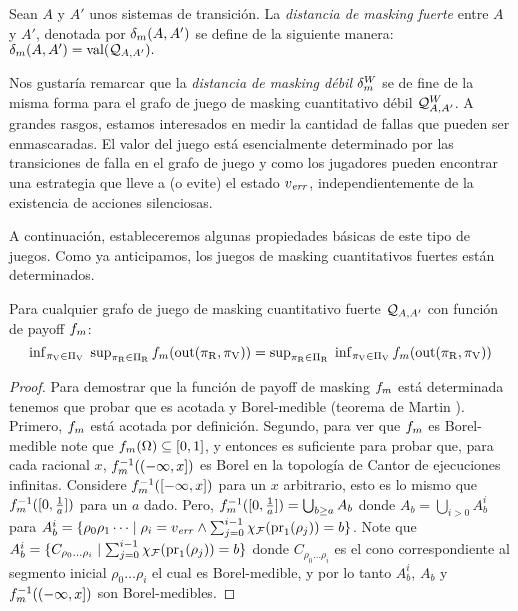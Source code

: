 \begin{defi} \label{def:mask_dist}
 Sean $A$ y $A'$ unos sistemas de transición. 
La \emph{distancia de masking fuerte} entre $A$ y $A'$, denotada por $\delta_{m}(A, A')$ se define de la siguiente manera:
$\delta_{m}(A, A') = \operatorname{val}(\mathcal{Q}_{A, A'}).$
\end{defi}

	Nos gustaría remarcar que la \emph{distancia de masking débil} $\delta_{m}^W$ se de fine de la misma forma para el grafo de juego de masking cuantitativo débil $\mathcal{Q}^W_{A,A'}$.  A grandes rasgos, estamos interesados en medir la cantidad de fallas que pueden ser enmascaradas. El valor del juego está esencialmente determinado por las transiciones de falla en el grafo de juego y como los jugadores pueden encontrar una estrategia que lleve a (o evite) el estado $v_{\mathit{err}}$, independientemente de la existencia de acciones silenciosas.

A continuación, estableceremos algunas propiedades básicas de este tipo de juegos. 
Como ya anticipamos, los juegos de masking cuantitativos fuertes están determinados.

\begin{thm} \label{thm:mask_game_det}
  Para cualquier grafo de juego de masking cuantitativo fuerte $\mathcal{Q}_{A, A'}$ con función de payoff $f_{m}$:
  \[\textstyle
  \inf_{\pi_{\mathrm{V}} \in \Pi_{\mathrm{V}}} \; \sup_{\pi_{\mathrm{R}} \in \Pi_{\mathrm{R}}} f_{m}(\operatorname{out}(\pi_{\mathrm{R}}, \pi_{\mathrm{V}})) = \sup_{\pi_{\mathrm{R}} \in \Pi_{\mathrm{R}}} \;  \inf_{\pi_{\mathrm{V}} \in \Pi_{\mathrm{V}}} f_{m}(\operatorname{out}(\pi_{\mathrm{R}}, \pi_{\mathrm{V}}))\]
\end{thm}
\begin{proof} Para demostrar que la función de payoff de masking $f_{m}$ está determinada tenemos que probar que es acotada y Borel-medible (teorema de Martin \cite{Martin98}). Primero, $f_{m}$ está acotada por definición. Segundo, para ver que $f_{m}$ es Borel-medible note que $f_{m}(\Omega) \subseteq [0,1]$, y entonces es suficiente para probar que, para cada racional $x$, $f_{m}^{-1}((-\infty, x])$ es Borel en la topología de Cantor de ejecuciones infinitas. 
Considere $f_{m}^{-1}([-\infty,x])$ para un $x$ arbitrario, esto es lo mismo que $f_{m}^{-1}([0, \frac{1}{a}])$ para un $a$ dado. Pero, $f_{m}^{-1}([0, \frac{1}{a}]) = \bigcup_{b \geq a} A_b$ donde
$A_b = \bigcup_{i >0} A^i_b$ para $A^i_b = \{ \rho_0 \rho_1 \dots \mid \rho_i = v_{\mathit{err}} \wedge \sum^{i-1}_{j=0} \chi_{\mathcal{F}}(\operatorname{pr}_{1}(\rho_j)) =b\}$. Note que 
$A^i_b = \{ C_{\rho_0 \dots \rho_i} \mid \sum^{i-1}_{j=0} \chi_{\mathcal{F}}(\operatorname{pr}_{1}(\rho_j)) =b\}$ donde $C_{\rho_0 \dots \rho_i}$ es el cono correspondiente al segmento inicial 
$\rho_0 \dots \rho_i$ el cual es Borel-medible, y por lo tanto $A^i_b$, $A_b$ y $f_{m}^{-1}((-\infty, x])$ son Borel-medibles.
\qedhere
\end{proof} \\


